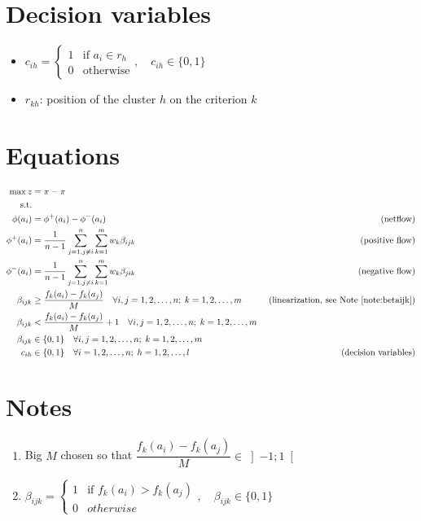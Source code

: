 \documentclass[a4paper]{article}
\begin{document}
    \section{Decision variables}
    \begin{itemize}
        \item $c_{ih} = \begin{cases}
            1 & \text{if } a_i \in r_h \\
            0 & \text{otherwise}
        \end{cases}, \quad c_{ih} \in \{0, 1\}$
        \item $r_{kh}$: position of the cluster $h$ on the criterion $k$
    \end{itemize}
    \section{Equations}
    \begin{align}
        \max z &= \pi_{} - \pi_{}\\
        \text{s.t.} & \\
        \phi(a_i) &= \phi^+(a_i) - \phi^-(a_i) & \text{ (netflow)} \\
        \phi^+(a_i) &= \frac{1}{n-1} \sum_{j=1, j\neq i}^{n} \sum_{k=1}^{m} w_k \beta_{ijk} & \text{ (positive flow)} \\
        \phi^-(a_i) &= \frac{1}{n-1} \sum_{j=1, j\neq i}^{n} \sum_{k=1}^{m} w_k \beta_{jik} & \text{ (negative flow)} \\
        \beta_{ijk} &\geq \frac{f_k(a_i)-f_k(a_j)}{M} \quad \forall i,j = 1, 2, \dots, n;\; k = 1, 2, \dots, m & \text{ (linearization, see Note \ref{note:betaijk})} \\
        \beta_{ijk} &< \frac{f_k(a_i)-f_k(a_j)}{M} + 1 \quad \forall i,j = 1, 2, \dots, n;\; k = 1, 2, \dots, m \\
        \beta_{ijk} &\in \{0,1\} \quad \forall i,j = 1, 2, \dots, n;\; k = 1, 2, \dots, m \\
        c_{ih} &\in \{0, 1\} \quad \forall i = 1, 2, \dots, n;\; h = 1, 2, \dots, l & \text{ (decision variables)}
    \end{align}
    \section{Notes}
    \begin{enumerate}
        \item \label{note:bigm} Big $M$ chosen so that $\dfrac{f_k(a_i)-f_k(a_j)}{M} \in \left]-1;1\right[$
        \item \label{note:betaijk} $\beta_{ijk} = \begin{cases}
            1 & \text{if } f_k(a_i) > f_k(a_j) \\
            0 & otherwise
        \end{cases}, \quad \beta_{ijk} \in \{0, 1\}$
    \end{enumerate}
\end{document}
